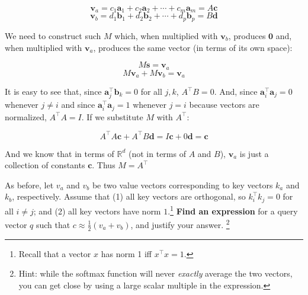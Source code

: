\begin{parts}
\begin{subparts}
{	$$\mathbf{v}_a = c_1 \mathbf{a}_1 + c_2 \mathbf{a}_2 + \cdots + c_m \mathbf{a}_m=A\mathbf{c}$$
	$$\mathbf{v}_b = d_1 \mathbf{b}_1 + d_2 \mathbf{b}_2 + \cdots + d_p \mathbf{b}_p=B\mathbf{d}$$
	
	We need to construct such $M$ which, when multiplied with $\mathbf{v}_b$, produces $\mathbf{0}$ and, when multiplied with $\mathbf{v}_a$, produces the same vector (in terms of its own space):
	
	$$M\mathbf{s}=\mathbf{v}_a$$
	$$M\mathbf{v}_a + M\mathbf{v}_b=\mathbf{v}_a$$
	
	It is easy to see that, since $\mathbf{a}_j^{\top}\mathbf{b}_{k}=0$ for all $j,k$, $A^{\top}B=0$. And, since $\mathbf{a}_i^{\top}\mathbf{a}_{j}=0$ whenever $j\ne i$ and since $\mathbf{a}_i^{\top}\mathbf{a}_{j}=1$ whenever $j=i$ because vectors are normalized, $A^{\top}A=I$. If we substitute $M$ with $A^{\top}$:
	
	$$A^{\top}A\mathbf{c}+A^{\top}B\mathbf{d}=I\mathbf{c}+0\mathbf{d}=\mathbf{c}$$
	
	And we know that in terms of $\mathbb{R}^{d}$ (not in terms of $A$ and $B$), $\mathbf{v}_a$ is just a collection of constants $\mathbf{c}$. Thus $M=A^{\top}$}

\subpart[4] As before, let $v_a$ and $v_b$ be two value vectors corresponding to key vectors $k_a$ and $k_b$, respectively.
Assume that (1) all key vectors are orthogonal, so $k_i^\top k_j = 0$ for all $i \neq j$; and (2) all key vectors have norm $1$.\footnote{Recall that a vector $x$ has norm 1 iff $x^\top x = 1$.}
\textbf{Find an expression} for a query vector $q$ such that $c \approx \frac{1}{2}(v_a + v_b)$, and justify your answer. \footnote{Hint: while the softmax function will never \textit{exactly} average the two vectors, you can get close by using a large scalar multiple in the expression.} 


\end{subparts}
\end{parts}
